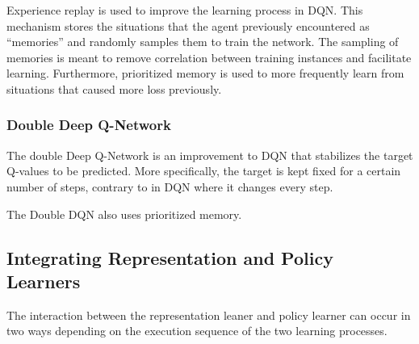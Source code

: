Experience replay is used to improve the learning process in DQN. 
This mechanism stores the situations that the agent previously encountered as ``memories'' and randomly samples them to train the network. 
The sampling of memories is meant to remove correlation between training instances and facilitate learning.
Furthermore, prioritized memory \citep{prioritized_memory} is used to more frequently learn from situations that caused more loss previously. %



\subsubsection{Double Deep Q-Network}
The double Deep Q-Network \citep{DDQN} is an improvement to DQN that stabilizes the target Q-values to be predicted. 
More specifically, the target is kept fixed for a certain number of steps, contrary to in DQN where it changes every step.

The Double DQN also uses prioritized memory.

\subsection{Integrating Representation and Policy Learners}
The interaction between the representation leaner and policy learner can occur in two ways depending on the execution sequence of the two learning processes.

